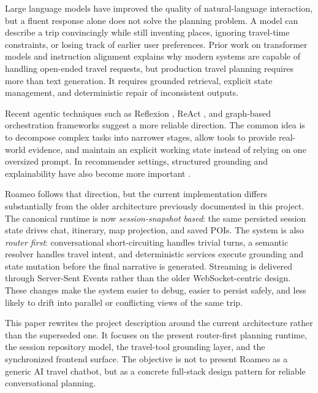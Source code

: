 \documentclass[conference]{IEEEtran}
\begin{document}
Large language models have improved the quality of natural-language interaction, but a fluent response alone does not solve the planning problem. A model can describe a trip convincingly while still inventing places, ignoring travel-time constraints, or losing track of earlier user preferences. Prior work on transformer models \cite{vaswani2017attention,brown2020language} and instruction alignment \cite{ouyang2022training} explains why modern systems are capable of handling open-ended travel requests, but production travel planning requires more than text generation. It requires grounded retrieval, explicit state management, and deterministic repair of inconsistent outputs.

Recent agentic techniques such as Reflexion \cite{shinn2023reflexion}, ReAct \cite{yao2023react}, and graph-based orchestration frameworks \cite{langchain2022,langgraph2024} suggest a more reliable direction. The common idea is to decompose complex tasks into narrower stages, allow tools to provide real-world evidence, and maintain an explicit working state instead of relying on one oversized prompt. In recommender settings, structured grounding and explainability have also become more important \cite{zheng2023chatrec,koren2009matrix}.

Roameo follows that direction, but the current implementation differs substantially from the older architecture previously documented in this project. The canonical runtime is now \textit{session-snapshot based}: the same persisted session state drives chat, itinerary, map projection, and saved POIs. The system is also \textit{router first}: conversational short-circuiting handles trivial turns, a semantic resolver handles travel intent, and deterministic services execute grounding and state mutation before the final narrative is generated. Streaming is delivered through Server-Sent Events rather than the older WebSocket-centric design. These changes make the system easier to debug, easier to persist safely, and less likely to drift into parallel or conflicting views of the same trip.

This paper rewrites the project description around the current architecture rather than the superseded one. It focuses on the present router-first planning runtime, the session repository model, the travel-tool grounding layer, and the synchronized frontend surface. The objective is not to present Roameo as a generic AI travel chatbot, but as a concrete full-stack design pattern for reliable conversational planning.
\end{document}
